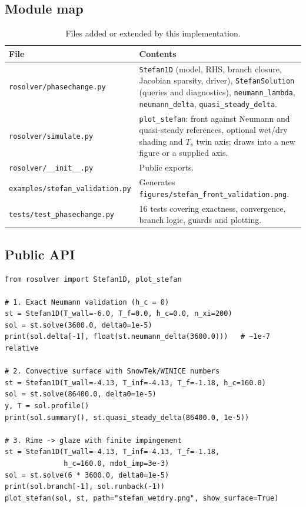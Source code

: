 \documentclass[11pt,a4paper]{article}
\newcommand{\Ts}{T_s}
\begin{document}
\subsection{Module map}

\begin{table}[htbp]
\centering
\caption{Files added or extended by this implementation.}
\label{tab:files}
\begin{tabularx}{\textwidth}{@{}lX@{}}
\toprule
File & Contents \\
\midrule
\texttt{rosolver/phasechange.py} &
\texttt{Stefan1D} (model, RHS, branch closure, Jacobian sparsity, driver),
\texttt{StefanSolution} (queries and diagnostics), \texttt{neumann\_lambda},
\texttt{neumann\_delta}, \texttt{quasi\_steady\_delta}. \\
\texttt{rosolver/simulate.py} &
\texttt{plot\_stefan}: front against Neumann and quasi-steady references, optional
wet/dry shading and $\Ts$ twin axis; draws into a new figure or a supplied axis. \\
\texttt{rosolver/\_\_init\_\_.py} & Public exports. \\
\texttt{examples/stefan\_validation.py} & Generates
\texttt{figures/stefan\_front\_validation.png}. \\
\texttt{tests/test\_phasechange.py} & 16 tests covering exactness, convergence,
branch logic, guards and plotting. \\
\bottomrule
\end{tabularx}
\end{table}

\subsection{Public API}

\begin{lstlisting}[style=py,caption={Typical use.},label={lst:api}]
from rosolver import Stefan1D, plot_stefan

# 1. Exact Neumann validation (h_c = 0)
st = Stefan1D(T_wall=-6.0, T_f=0.0, h_c=0.0, n_xi=200)
sol = st.solve(3600.0, delta0=1e-5)
print(sol.delta[-1], float(st.neumann_delta(3600.0)))   # ~1e-7 relative

# 2. Convective surface with SnowTek/WINICE numbers
st = Stefan1D(T_wall=-4.13, T_inf=-4.13, T_f=-1.18, h_c=160.0)
sol = st.solve(86400.0, delta0=1e-5)
y, T = sol.profile()
print(sol.summary(), st.quasi_steady_delta(86400.0, 1e-5))

# 3. Rime -> glaze with finite impingement
st = Stefan1D(T_wall=-4.13, T_inf=-4.13, T_f=-1.18,
              h_c=160.0, mdot_imp=3e-3)
sol = st.solve(6 * 3600.0, delta0=1e-5)
print(sol.branch[-1], sol.runback(-1))
plot_stefan(sol, st, path="stefan_wetdry.png", show_surface=True)
\end{lstlisting}
\end{document}
